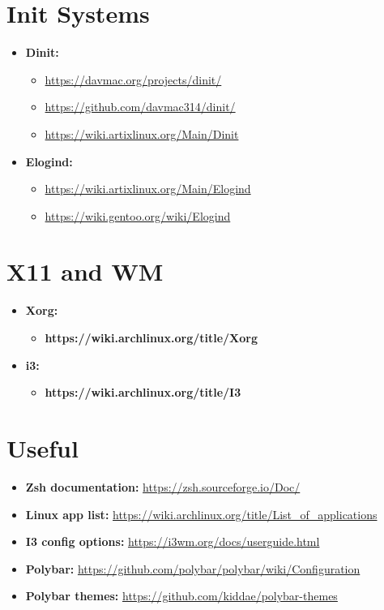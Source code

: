 \documentclass[10pt, a4paper, onecolumn, oneside, titlepage, openany]{book}
\begin{document}
\section{Init Systems}
\begin{itemize}
    \item \textbf{Dinit:}
    \begin{itemize}
        \item \url{https://davmac.org/projects/dinit/}
        \item \url{https://github.com/davmac314/dinit/}
        \item \url{https://wiki.artixlinux.org/Main/Dinit}
    \end{itemize}
    \item \textbf{Elogind:}
    \begin{itemize}
        \item \url{https://wiki.artixlinux.org/Main/Elogind}
        \item \url{https://wiki.gentoo.org/wiki/Elogind}
    \end{itemize}
\end{itemize}

\section{X11 and WM}
\begin{itemize}
    \item \textbf{Xorg:}
    \begin{itemize}
        \item \textbf{https://wiki.archlinux.org/title/Xorg}
    \end{itemize}
    \item \textbf{i3:}
        \begin{itemize}
            \item \textbf{https://wiki.archlinux.org/title/I3}
        \end{itemize}
\end{itemize}

\section{Useful}
\begin{itemize}
    \item \textbf{Zsh documentation:} \url{https://zsh.sourceforge.io/Doc/}
    \item \textbf{Linux app list:} \url{https://wiki.archlinux.org/title/List_of_applications}
    \item \textbf{I3 config options:} \url{https://i3wm.org/docs/userguide.html}
    \item \textbf{Polybar:} \url{https://github.com/polybar/polybar/wiki/Configuration}
    \item \textbf{Polybar themes:} \url{https://github.com/kiddae/polybar-themes}    
\end{itemize}
\end{document}
